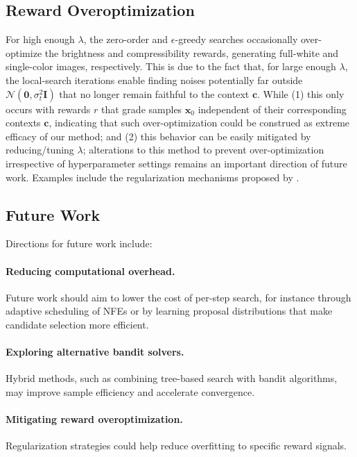 \documentclass{article}
\newcommand{\x}{\mathbf{x}}
\begin{document}
\subsection{Reward Overoptimization}

For high enough $\lambda$, the zero-order and $\epsilon$-greedy searches occasionally over-optimize the brightness and compressibility rewards, generating full-white and single-color images, respectively. This is due to the fact that, for large enough $\lambda$, the local-search iterations enable finding noises potentially far outside $\mathcal{N}(\mathbf{0},\sigma_t^2\mathbf{I})$ that no longer remain faithful to the context $\mathbf{c}$. While (1) this only occurs with rewards $r$ that grade samples $\x_0$ independent of their corresponding contexts $\mathbf{c}$, indicating that such over-optimization could be construed as extreme efficacy of our method; and (2) this behavior can be easily mitigated by reducing/tuning $\lambda$; alterations to this method to prevent over-optimization irrespective of hyperparameter settings remains an important direction of future work. Examples include the regularization mechanisms proposed by \citet{zhang2024confrontingrewardoveroptimizationdiffusion,tang2024inferencetimealignmentdiffusionmodels}.


\subsection{Future Work} 

Directions for future work include:

\paragraph{Reducing computational overhead.} Future work should aim to lower the cost of per-step search, for instance through adaptive scheduling of NFEs or by learning proposal distributions that make candidate selection more efficient.  

\paragraph{Exploring alternative bandit solvers.} Hybrid methods, such as combining tree-based search with bandit algorithms, may improve sample efficiency and accelerate convergence.  

\paragraph{Mitigating reward overoptimization.} Regularization strategies could help reduce overfitting to specific reward signals.
\end{document}
